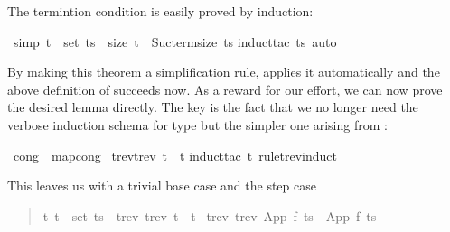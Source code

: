 %
\begin{isabellebody}%
%
\begin{isamarkuptext}%
\noindent
The termintion condition is easily proved by induction:%
\end{isamarkuptext}%
\ {\isacharbrackleft}simp{\isacharbrackright}{\isacharcolon}\ {\isachardoublequote}t\ {\isasymin}\ set\ ts\ {\isasymlongrightarrow}\ size\ t\ {\isacharless}\ Suc{\isacharparenleft}term{\isacharunderscore}size\ ts{\isacharparenright}{\isachardoublequote}\isanewline
{}induct{\isacharunderscore}tac\ ts{\isacharcomma}\ auto{\isacharparenright}%
\begin{isamarkuptext}%
\noindent
By making this theorem a simplification rule, 
applies it automatically and the above definition of 
succeeds now. As a reward for our effort, we can now prove the desired
lemma directly. The key is the fact that we no longer need the verbose
induction schema for type  but the simpler one arising from
:%
\end{isamarkuptext}%
\ {\isacharbrackleft}cong{\isacharbrackright}\ {\isacharequal}\ map{\isacharunderscore}cong\isanewline
{}\ {\isachardoublequote}trev{\isacharparenleft}trev\ t{\isacharparenright}\ {\isacharequal}\ t{\isachardoublequote}\isanewline
{}induct{\isacharunderscore}tac\ t\ rule{\isacharcolon}trev{\isachardot}induct{\isacharparenright}%
\begin{isamarkuptxt}%
\noindent
This leaves us with a trivial base case  and the step case
\begin{quote}

\begin{isabelle}%
{\isasymforall}\mbox{t}{\isachardot}\ \mbox{t}\ {\isasymin}\ set\ \mbox{ts}\ {\isasymlongrightarrow}\ trev\ {\isacharparenleft}trev\ \mbox{t}{\isacharparenright}\ {\isacharequal}\ \mbox{t}\ {\isasymLongrightarrow}\isanewline
trev\ {\isacharparenleft}trev\ {\isacharparenleft}App\ \mbox{f}\ \mbox{ts}{\isacharparenright}{\isacharparenright}\ {\isacharequal}\ App\ \mbox{f}\ \mbox{ts}
\end{isabelle}%


\end{quote}
\end{isamarkuptxt}
\end{isabellebody}

